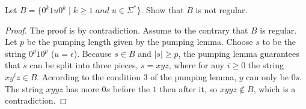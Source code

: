\documentclass[11pt]{article}
\newenvironment{problem}[2][Problem]{\begin{trivlist}
\item[\hskip \labelsep {\bfseries #1}\hskip \labelsep {\bfseries #2.}]}{\end{trivlist}}
\begin{document}
\begin{problem}[Part]{b}
Let $B = \{0^{k}1u0^{k} \; | \; k \geq 1 \; and \; u \in \Sigma^{*}\}$. Show that $B$ is not regular.
\end{problem}

\begin{proof}
The proof is by contradiction. Assume to the contrary that $B$ is regular. Let $p$ be the pumping length given by the pumping lemma. Choose $s$ to be the string $0^p10^p$ ($u = \epsilon$). Because $s \in B$ and $|s| \geq p$, the pumping lemma guarantees that $s$ can be split into three pieces, $s = xyz$, where for any $i \geq 0$ the string $xy^iz \in B$. According to the condition 3 of the pumping lemma, $y$ can only be $0s$. The string $xyyz$ has more $0s$ before the $1$ then after it, so $xyyz \notin B$, which is a contradiction.
\end{proof}
\end{document}
